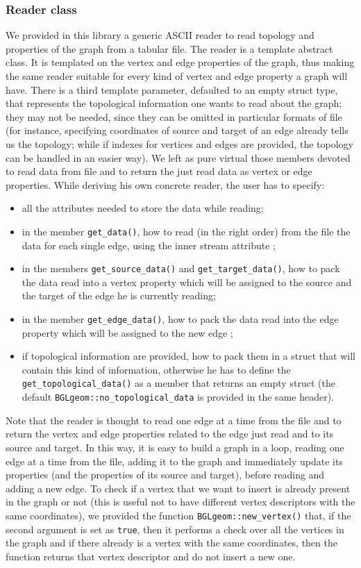 \documentclass[10pt]{article} %
\begin{document}
	\subsubsection{Reader class}		
	We provided in this library a generic ASCII reader to read topology and properties of the graph from a tabular file. The reader is a template abstract class. It is templated on the vertex and edge properties of the graph, thus making the same reader suitable for every kind of vertex and edge property a graph will have. There is a third template parameter, defaulted to an empty struct type, that represents the topological information one wants to read about the graph; they may not be needed, since they can be omitted in particular formats of file (for instance, specifying coordinates of source and target of an edge already tells us the topology; while if indexes for vertices and edges are provided, the topology can be handled in an easier way). \newline
	We left as pure virtual those members devoted to read data from file and to return the just read data as vertex or edge properties. While deriving his own concrete reader, the user has to specify:
	\begin{itemize}
		\item all the attributes needed to store the data while reading;
		\item in the member \texttt{get\_data()}, how to read (in the right order) from the file the data for each single edge, using the inner stream attribute ;
		\item in the members \texttt{get\_source\_data()} and \texttt{get\_target\_data()}, how to pack the data read into a vertex property which will be assigned to the source and the target of the edge he is currently reading;
		\item in the member \texttt{get\_edge\_data()}, how to pack the data read into the edge property which will be assigned to the new edge ;
		\item if topological information are provided, how to pack them in a struct that will contain this kind of information, otherwise he has to define the \texttt{get\_topological\_data()} as a member that returns an empty struct (the default \texttt{BGLgeom::no\_topological\_data} is provided in the same header).
	\end{itemize}
	Note that the reader is thought to read one edge at a time from the file and to return the vertex and edge properties related to the edge just read and to its source and target. In this way, it is easy to build a graph in a loop, reading one edge at a time from the file, adding it to the graph and immediately update its properties (and the properties of its source and target), before reading and adding a new edge. To check if a vertex that we want to insert is already present in the graph or not (this is useful not to have different vertex descriptors with the same coordinates), we provided the function \texttt{BGLgeom::new\_vertex()} that, if the second argument is set as \texttt{true}, then it performs a check over all the vertices in the graph and if there already is a vertex with the same coordinates, then the function returns that vertex descriptor and do not insert a new one. \newline
\end{document}
